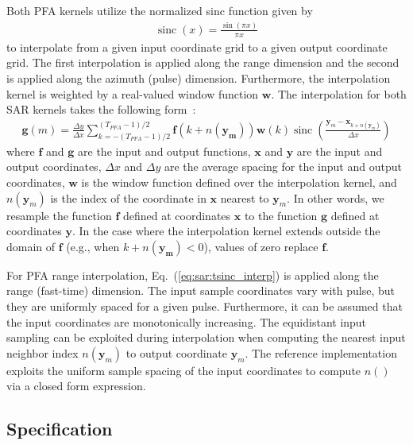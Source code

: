 \documentclass{report}
\begin{document}
Both PFA kernels utilize the normalized sinc function given by
\begin{align*}
\operatorname{sinc}(x) = \frac{\sin(\pi x)}{\pi x}
\end{align*}
to interpolate from a given input coordinate grid to a given output 
coordinate grid.
The first interpolation is applied along the range dimension and
the second is applied along the azimuth (pulse) dimension.
Furthermore, the interpolation kernel is weighted by a real-valued window
function $\mathbf{w}$.
The interpolation for both SAR kernels takes the following form~\cite[Chapter~6]{POMRv2}:
\begin{align}
    \mathbf{g}(m) = \frac{\Delta y}{\Delta x} \sum_{k=-(T_{PFA}-1)/2}^{(T_{PFA}-1)/2} \mathbf{f}(k+n(\mathbf{y_m}))
        \mathbf{w}(k) \operatorname{sinc}\left(\frac{\mathbf{y}_m - \mathbf{x}_{k+n(\mathbf{y}_m)}}{\Delta x}\right)
    \label{eq:sar:tsinc_interp}
\end{align}
where $\mathbf{f}$ and $\mathbf{g}$ are the input and output functions,
$\mathbf{x}$ and $\mathbf{y}$ are the input and output coordinates,
$\Delta x$ and $\Delta y$ are the average spacing for the input and output coordinates,
$\mathbf{w}$ is the window function defined over the interpolation kernel, and
$n(\mathbf{y}_m)$ is the index of the coordinate in $\mathbf{x}$ nearest to $\mathbf{y}_m$.
In other words, we resample the function $\mathbf{f}$ defined at coordinates
$\mathbf{x}$ to the function $\mathbf{g}$ defined at coordinates $\mathbf{y}$.
In the case where the interpolation kernel extends outside the domain of $\mathbf{f}$
(e.g., when $k+n(\mathbf{y_m}) < 0$), values of zero replace $\mathbf{f}$.

For PFA range interpolation, Eq.~(\ref{eq:sar:tsinc_interp}) is applied along
the range (fast-time) dimension.
The input sample coordinates vary with pulse, but they are uniformly spaced
for a given pulse.
Furthermore, it can be assumed that the input coordinates are
monotonically increasing.
The equidistant input sampling can be exploited during interpolation 
when computing the nearest input neighbor index $n(\mathbf{y}_m)$ to
output coordinate $\mathbf{y}_m$.
The reference implementation exploits the uniform sample spacing of the
input coordinates to compute $n()$ via a closed form expression.

\subsection{Specification}
\end{document}
